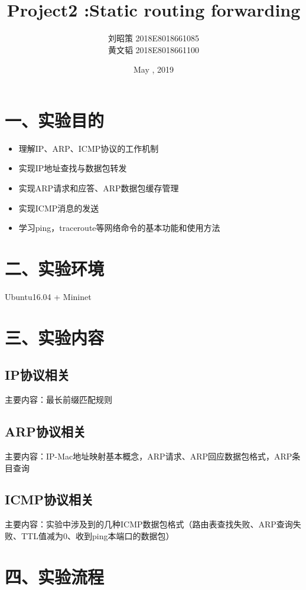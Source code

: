 \documentclass[12pt,a4paper]{ctexart}%
\title{Project2 :Static routing forwarding}
\author{刘昭策 2018E8018661085\\
	黄文韬 2018E8018661100}
\date{May , 2019}%
\begin{document}
	
	\maketitle
	\pagestyle{plain}%
	\section*{一、实验目的}
		\begin{itemize}
			\item 理解IP、ARP、ICMP协议的工作机制
			\item 实现IP地址查找与数据包转发
			\item 实现ARP请求和应答、ARP数据包缓存管理
			\item 实现ICMP消息的发送
			\item 学习ping，traceroute等网络命令的基本功能和使用方法
		\end{itemize}
		
	\section*{二、实验环境}
	Ubuntu16.04 + Mininet
	
	\section*{三、实验内容}
		\subsection{IP协议相关}
		主要内容：最长前缀匹配规则
				
		\subsection{ARP协议相关}
		主要内容：IP-Mac地址映射基本概念，ARP请求、ARP回应数据包格式，ARP条目查询
		
		\subsection{ICMP协议相关}
		主要内容：实验中涉及到的几种ICMP数据包格式（路由表查找失败、ARP查询失败、TTL值减为0、收到ping本端口的数据包）
	
	\section*{四、实验流程}
		\setcounter{subsection}{0}
		
\end{document}

